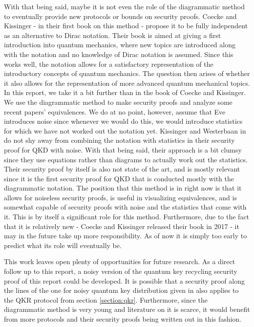 \documentclass[]{article}
\begin{document}
With that being said, maybe it is not even the role of the diagrammatic method to eventually provide new protocols or bounds on security proofs. Coecke and Kissinger - in their first book on this method - propose it to be fully independent as an alternative to Dirac notation. Their book is aimed at giving a first introduction into quantum mechanics, where new topics are introduced along with the notation and no knowledge of Dirac notation is assumed. Since this works well, the notation allows for a satisfactory representation of the introductory concepts of quantum mechanics. The question then arises of whether it also allows for the representation of more advanced quantum mechanical topics. In this report, we take it a bit further than in the book of Coecke and Kissinger. We use the diagrammatic method to make security proofs and analyze some recent papers' equivalences. We do at no point, however, assume that Eve introduces noise since whenever we would do this, we would introduce statistics for which we have not worked out the notation yet. Kissinger and Westerbaan in \cite{Kissinger2017} do not shy away from combining the notation with statistics in their security proof for QKD with noise. With that being said, their approach is a bit clumsy since they use equations rather than diagrams to actually work out the statistics. Their security proof by itself is also not state of the art, and is mostly relevant since it is the first security proof for QKD that is conducted mostly with the diagrammatic notation. The position that this method is in right now is that it allows for noiseless security proofs, is useful in visualizing equivalences, and is somewhat capable of security proofs with noise and the statistics that come with it. This is by itself a significant role for this method. Furthermore, due to the fact that it is relatively new - Coecke and Kissinger released their book in 2017 \cite{Coecke2017} - it may in the future take up more responsibility. As of now it is simply too early to predict what its role will eventually be.


This work leaves open plenty of opportunities for future research. As a direct follow up to this report, a noisy version of the quantum key recycling security proof of this report could be developed. It is possible that a security proof along the lines of the one for noisy quantum key distribution given in \cite{Kissinger2017} also applies to the QKR protocol from section \ref{section:qkr}. Furthermore, since the diagrammatic method is very young and literature on it is scarce, it would benefit from more protocols and their security proofs being written out in this fashion.
\end{document}
